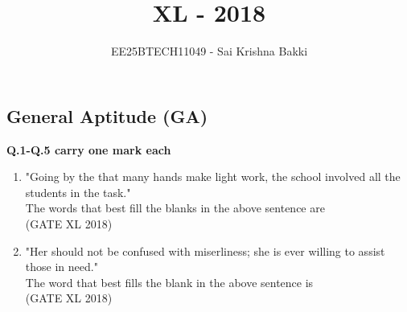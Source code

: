\documentclass[14pt]{extarticle}
\title{\textbf{\Huge XL - 2018}}
\author{EE25BTECH11049 - Sai Krishna Bakki}
\date{}
\begin{document}
\maketitle

\begin{flushleft}
\begin{center}   
\section*{General Aptitude (GA)}
\end{center}

\textbf{Q.1-Q.5 carry one mark each}


\begin{enumerate}
\item "Going by the \underline{\hspace{2cm}} that many hands make light work, the school \underline{\hspace{2cm}} involved all the students in the task."\\ [2ex]
The words that best fill the blanks in the above sentence are\\
\hfill(GATE XL 2018)\\
\begin{enumerate}[label=(\Alph*)]
\end{enumerate}

\item "Her \underline{\hspace{2cm}} should not be confused with miserliness; she is ever willing to assist those in need."\\[2ex] The word that best fills the blank in the above sentence is\\
\hfill(GATE XL 2018)\\
\begin{enumerate}[label=(\Alph*)]
\end{enumerate}


\end{enumerate}
\end{flushleft}
\end{document}
